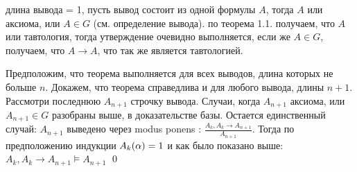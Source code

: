  длина вывода = 1, пусть вывод состоит из одной формулы $A$, тогда $A$ или аксиома, или $A \in G$ (см. определение вывода). по теорема 1.1. получаем, что $A$ или тавтология, тогда утверждение очевидно выполняется, если же $A \in G$, получаем, что $A \to A$, что так же является тавтологией.

 Предположим, что теорема выполняется для всех выводов, длина которых не больше $n$. Докажем, что теорема справедлива и для любого вывода, длины $n+1$. Рассмотри последнюю $A_{n+1}$ строчку вывода. Случаи, когда $A_{n+1}$ аксиома, или $A_{n+1} \in G$ разобраны выше, в доказательстве базы. Остается единственный случай: $A_{n+1}$ выведено через modus ponens : $\frac{A_k, A_k \to A_{n+1}}{A_{n+1}}$. Тогда по предположению индукции $A_{k}(\alpha)=1$ и как было показано выше: $A_k, A_k \to A_{n+1} \vDash A_{n+1}$ \qed
